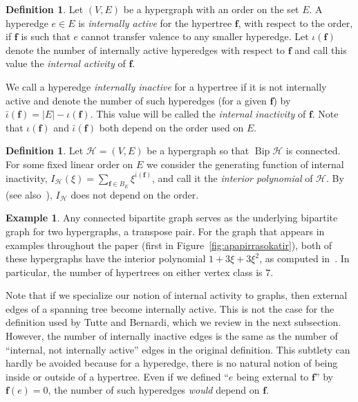 \documentclass[10pt]{amsart}
\theoremstyle{definition}\newtheorem{defi}[theo]{Definition}
\newtheorem{exam}[theo]{Example}
\theoremstyle{remark}\newtheorem{rema}[theo]{Remark}
\newcommand{\HH}{\mathcal H}
\DeclareMathOperator{\bip}{Bip}
\begin{document}
\begin{defi}
\label{def:activity}
Let $(V,E)$ be a hypergraph with an order on the set $E$. A hyperedge $e\in E$ is \emph{internally active} for the hypertree $\mathbf{f}$, with respect to the order, if $\mathbf f$ is such that $e$ cannot transfer valence to any smaller hyperedge. Let $\iota(\mathbf{f})$ denote the number of internally active hyperedges with respect to $\mathbf{f}$ and call this value the \emph{internal activity} of $\mathbf f$. 
\end{defi}

We call a hyperedge \emph{internally inactive} for a hypertree if it is not internally active and denote the number of such hyperedges (for a given $\mathbf{f}$) by $\bar\iota(\mathbf{f})=|E|-\iota(\mathbf{f})$. This value will be called the \emph{internal inactivity} of $\mathbf{f}$. Note that $\iota(\mathbf{f})$ and $\bar\iota(\mathbf{f})$ both depend on the order used on $E$.

\begin{defi}
\label{def:I}
Let $\HH=(V,E)$ be a hypergraph so that $\bip\HH$ is connected. For some fixed linear order on $E$ we consider the generating function of internal inactivity, $I_\HH(\xi)=\sum_{\mathbf{f}\in B_{E}} \xi^{\bar\iota(\mathbf{f})}$, and call it the \emph{interior polynomial} of $\HH$. By~\cite[Theorem~5.4]{hiperTutte} (see also~\cite[Subsection~2.2]{KP_Ehrhart}), $I_\HH$ does not depend on the order.
\end{defi}

\begin{exam}
Any connected bipartite graph serves as the underlying bipartite graph for two hypergraphs, a transpose pair. For the graph that appears in examples throughout the paper (first in Figure~\ref{fig:apapirrasokatir}), both of these hypergraphs have the interior polynomial $1+3\xi+3\xi^2$, as computed in~\cite[Example~5.6]{hiperTutte}. In particular, the number of hypertrees on either vertex class is $7$.
\end{exam}

Note that if we specialize our notion of internal activity to graphs, then external edges of a spanning tree become internally active. This is not the case for the definition used by Tutte and Bernardi, which we review in the next subsection. However, the number of internally inactive edges is the same as the number of ``internal, not internally active'' edges in the original definition. This subtlety can hardly be avoided because for a hyperedge, there is no natural notion of being inside or outside of a hypertree. Even if we defined ``$e$ being external to $\mathbf f$'' by $\mathbf f(e)=0$, the number of such hyperedges \emph{would} depend on $\mathbf f$.
\end{document}
